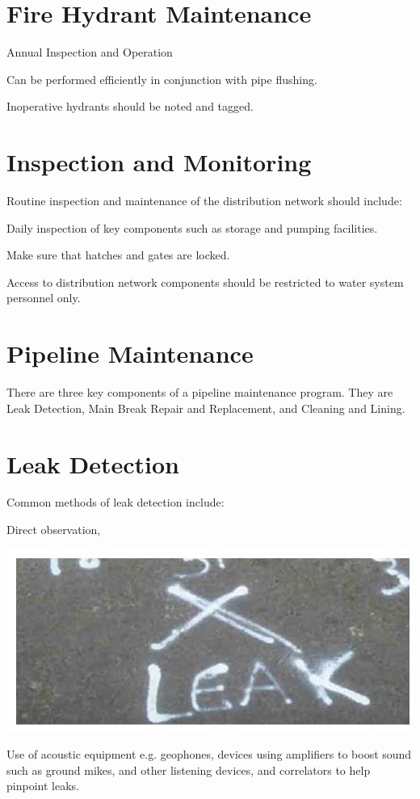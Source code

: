 \documentclass[10pt]{article}
\begin{document}
\section{Fire Hydrant Maintenance}
Annual Inspection and Operation

Can be performed efficiently in conjunction with pipe flushing.

Inoperative hydrants should be noted and tagged.

\section{Inspection and Monitoring}
Routine inspection and maintenance of the distribution network should include:

Daily inspection of key components such as storage and pumping facilities.

Make sure that hatches and gates are locked.

Access to distribution network components should be restricted to water system personnel only.

\section{Pipeline Maintenance}
There are three key components of a pipeline maintenance program. They are Leak Detection, Main Break Repair and Replacement, and Cleaning and Lining.

\section{Leak Detection}
Common methods of leak detection include:

Direct observation,

\includegraphics[max width=\textwidth]{2022_10_30_098bb5f44c5986ff92a9g-40}

Use of acoustic equipment e.g. geophones, devices using amplifiers to boost sound such as ground mikes, and other listening devices, and correlators to help pinpoint leaks.
\end{document}
